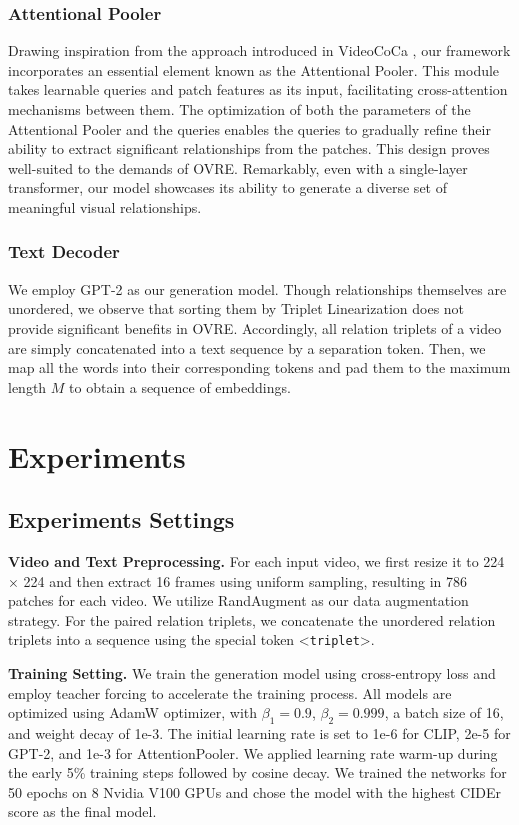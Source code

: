 \documentclass[letterpaper]{article}
\begin{document}
\subsubsection{Attentional Pooler}
Drawing inspiration from the approach introduced in VideoCoCa \cite{yan2023videococa},
our framework incorporates an essential element known as the Attentional Pooler. This module takes learnable queries and patch features as its input, facilitating cross-attention mechanisms between them.
The optimization of both the parameters of the Attentional Pooler and the queries enables the queries to gradually refine their ability to extract significant relationships from the patches. This design proves well-suited to the demands of OVRE. Remarkably, even with a single-layer transformer, our model showcases its ability to generate a diverse set of meaningful visual relationships.



\subsubsection{Text Decoder}
We employ GPT-2 \cite{radford2019language} as our generation model.
Though relationships themselves are unordered, we observe that sorting them by Triplet Linearization \cite{cabot2021rebel} does not provide significant benefits in OVRE.
Accordingly, all relation triplets of a video are simply concatenated into a text sequence by a separation token.
Then, we map all the words into their corresponding tokens and pad them to the maximum length $M$ to obtain a sequence of embeddings.

\section{Experiments}
\subsection{Experiments Settings}
\noindent\textbf{Video and Text Preprocessing. }
For each input video, we first resize it to 224 $\times$ 224 and then extract 16 frames using uniform sampling, resulting in 786 patches for each video. We utilize RandAugment \cite{Ekin2019randaugment} as our data augmentation strategy.
For the paired relation triplets, we concatenate the unordered relation triplets into a sequence using the special token \textless\texttt{triplet}\textgreater.

\noindent\textbf{Training Setting. }
We train the generation model using cross-entropy loss and employ teacher forcing to accelerate the training process.
All models are optimized using AdamW optimizer, with $\beta_{1}=0.9$, $\beta_{2}=0.999$, a batch size of 16, and weight decay of 1e-3.
The initial learning rate is set to 1e-6 for CLIP, 2e-5 for GPT-2, and 1e-3 for AttentionPooler.
We applied learning rate warm-up during the early 5\% training steps followed by cosine decay.
We trained the networks for 50 epochs on 8 Nvidia V100 GPUs and chose the model with the highest CIDEr score as the final model.
\end{document}
